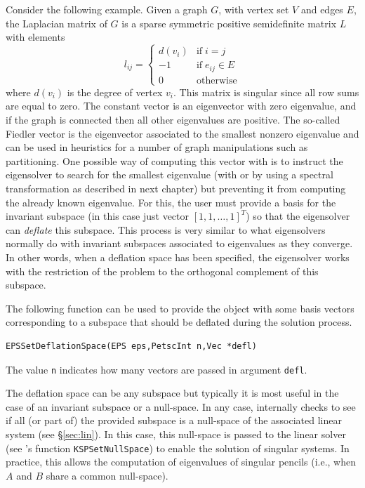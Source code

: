 	Consider the following example. Given a graph $G$, with vertex set $V$ and edges $E$, the Laplacian matrix of $G$ is a sparse symmetric positive semidefinite matrix $L$ with elements
$$l_{ij}=\left\{\begin{array}{cl}
         d(v_i) & \mathrm{if}\;i=j\\
         -1 & \mathrm{if}\;e_{ij}\in E\\
         0&\mathrm{otherwise}
\end{array}\right.$$
where $d(v_i)$ is the degree of vertex $v_i$. This matrix is singular since all row sums are equal to zero. The constant vector is an eigenvector with zero eigenvalue, and if the graph is connected then all other eigenvalues are positive. The so-called Fiedler vector is the eigenvector associated to the smallest nonzero eigenvalue and can be used in heuristics for a number of graph manipulations such as partitioning. One possible way of computing this vector with \slepc is to instruct the eigensolver to search for the smallest eigenvalue (with  or by using a spectral transformation as described in next chapter) but preventing it from computing the already known eigenvalue. For this, the user must provide a basis for the invariant subspace (in this case just vector $[1,1,\ldots,1]^T$) so that the eigensolver can \emph{deflate} this subspace. This process is very similar to what eigensolvers normally do with invariant subspaces associated to eigenvalues as they converge. In other words, when a deflation space has been specified, the eigensolver works with the restriction of the problem to the orthogonal complement of this subspace.

	The following function can be used to provide the  object with some basis vectors corresponding to a subspace that should be deflated during the solution process. 
	\begin{Verbatim}[fontsize=\small]
	EPSSetDeflationSpace(EPS eps,PetscInt n,Vec *defl)
	\end{Verbatim}
The value \texttt{n} indicates how many vectors are passed in argument \texttt{defl}.

	The deflation space can be any subspace but typically it is most useful in the case of an invariant subspace or a null-space. In any case, \slepc internally checks to see if all (or part of) the provided subspace is a null-space of the associated linear system (see \S\ref{sec:lin}). In this case, this null-space is passed to the linear solver (see \petsc's function \texttt{KSPSetNullSpace}) to enable the solution of singular systems. In practice, this allows the computation of eigenvalues of singular pencils (i.e., when $A$ and $B$ share a common null-space).

